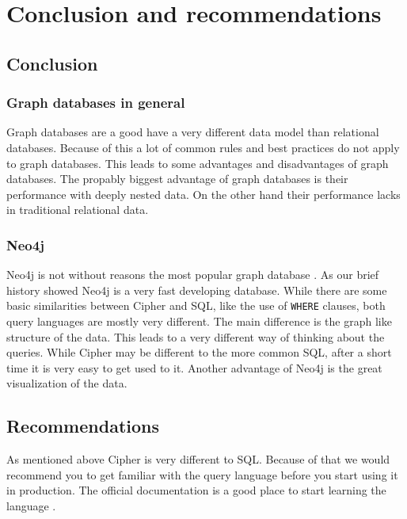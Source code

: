 \section{Conclusion and recommendations}
\subsection{Conclusion}
\subsubsection{Graph databases in general}
Graph databases are a good have a very different data model than relational
databases. Because of this a lot of common rules and best practices do not apply
to graph databases. This leads to some advantages and disadvantages of graph
databases. The propably biggest advantage of graph databases is their
performance with deeply nested data. On the other hand their performance lacks
in traditional relational data.

\subsubsection{Neo4j}
Neo4j is not without reasons the most popular graph database
\cite{db-engines}. As our brief history showed
Neo4j is a very fast developing database. While there are some basic
similarities between Cipher and SQL, like the use of \texttt{WHERE} clauses,
both query languages are mostly very different. The main difference is the graph
like structure of the data. This leads to a very different way of thinking about
the queries. While Cipher may be different to the more common SQL, after a short
time it is very easy to get used to it. Another advantage of Neo4j is the great
visualization of the data.

\subsection{Recommendations}
As mentioned above Cipher is very different to SQL. Because of that we would
recommend you to get familiar with the query language before you start using it
in production. The official documentation is a good place to start learning the
language \cite{neo4j:cypher}.

